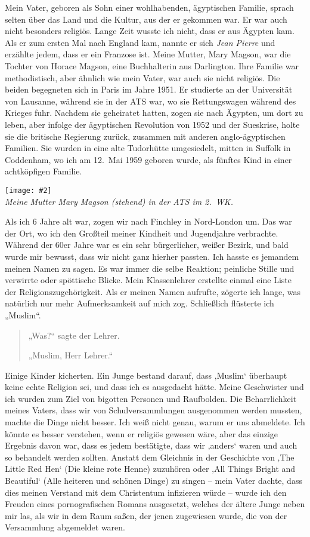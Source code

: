 \documentclass[12pt]{memoir}
\newcommand{\img}[3]{\begin{center}%
\texttt{[image: \#2]}\\{\small\em#3}%
\end{center}}
\begin{document}
Mein Vater, geboren als Sohn einer wohlhabenden, ägyptischen Familie,
sprach selten über das Land und die Kultur, aus der er gekommen war.
Er war auch nicht besonders religiös.
Lange Zeit wusste ich nicht, dass er aus Ägypten kam.
Als er zum ersten Mal nach England kam,
nannte er sich \emph{Jean Pierre} und erzählte jedem, dass er ein Franzose ist.
Meine Mutter, Mary Magson, war die Tochter von Horace Magson,
eine Buchhalterin aus Darlington.
Ihre Familie war methodistisch, aber ähnlich wie mein Vater,
war auch sie nicht religiös.
Die beiden begegneten sich in Paris im Jahre 1951.
Er studierte an der Universität von Lausanne, während sie in der ATS war,
wo sie Rettungswagen während des Krieges fuhr.
Nachdem sie geheiratet hatten, zogen sie nach Ägypten, um dort zu leben,
aber infolge der ägyptischen Revolution von 1952 und der Sueskrise,
holte sie die britische Regierung zurück,
zusammen mit anderen anglo-ägyptischen Familien.
Sie wurden in eine alte Tudorhütte umgesiedelt,
mitten in Suffolk in Coddenham, wo ich am 12.\ Mai 1959 geboren wurde,
als fünftes Kind in einer achtköpfigen Familie.

\img{scale=0.7}{Hassans_Mother.jpg}
{Meine Mutter Mary Magson (stehend) in der ATS im 2.\ WK.}

Als ich 6 Jahre alt war, zogen wir nach Finchley in Nord-London um.
Das war der Ort, wo ich den Großteil
meiner Kindheit und Jugendjahre verbrachte.
Während der 60er Jahre war es ein sehr bürgerlicher, weißer Bezirk,
und bald wurde mir bewusst, dass wir nicht ganz hierher passten.
Ich hasste es jemandem meinen Namen zu sagen.
Es war immer die selbe Reaktion;
peinliche Stille und verwirrte oder spöttische Blicke.
Mein Klassenlehrer erstellte einmal eine Liste der Religionszugehörigkeit.
Als er meinen Namen aufrufte, zögerte ich lange,
was natürlich nur mehr Aufmerksamkeit auf mich zog.
Schließlich flüsterte ich „Muslim“.

\begin{quote}
„Was?“ sagte der Lehrer.

„Muslim, Herr Lehrer.“
\end{quote}

Einige Kinder kicherten.
Ein Junge bestand darauf, dass ‚Muslim‘ überhaupt keine echte Religion sei,
und dass ich es ausgedacht hätte.
Meine Geschwister und ich wurden zum Ziel von bigotten Personen und Raufbolden.
Die Beharrlichkeit meines Vaters,
dass wir von Schulversammlungen ausgenommen werden mussten,
machte die Dinge nicht besser.
Ich weiß nicht genau, warum er uns abmeldete.
Ich könnte es besser verstehen, wenn er religiös gewesen wäre,
aber das einzige Ergebnis davon war, dass es jedem bestätigte,
dass wir ‚anders‘ waren und auch so behandelt werden sollten.
Anstatt dem Gleichnis in der Geschichte von ‚The Little Red Hen‘
(Die kleine rote Henne) zuzuhören oder ‚All Things Bright and Beautiful‘
(Alle heiteren und schönen Dinge) zu singen – mein Vater dachte,
dass dies meinen Verstand mit dem Christentum infizieren würde –
wurde ich den Freuden eines pornografischen Romans ausgesetzt,
welches der ältere Junge neben mir las, als wir in dem Raum saßen,
der jenen zugewiesen wurde, die von der Versammlung abgemeldet waren.
\end{document}
